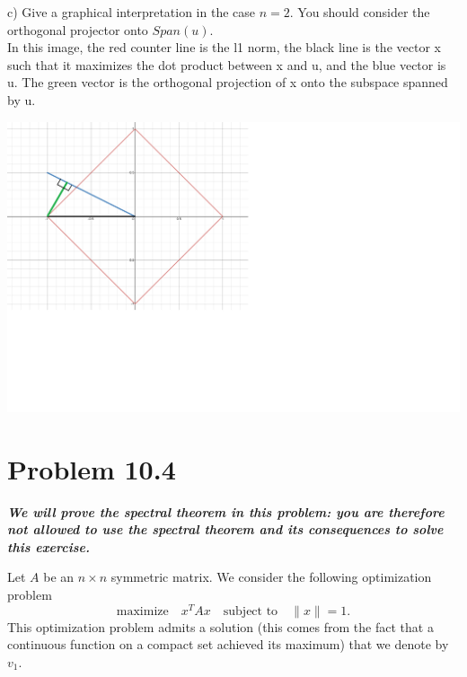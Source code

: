 \documentclass[12pt,twoside]{article}
\newcommand{\sT}{T}
\begin{document}
\newpage 

c) Give a graphical interpretation in the case $n=2$. You should consider the orthogonal projector onto $Span(u)$.\\

In this image, the red counter line is the l1 norm, the black line is the vector x such that it maximizes the dot product between x and u, and the blue vector is u. The green vector is the orthogonal projection of x onto the subspace spanned by u.

\includegraphics[scale=.5]{image2.png}



\newpage

\section{Problem 10.4}
	\emph{\textbf{We will prove the spectral theorem in this problem: you are therefore not allowed to use the spectral theorem and its consequences to solve this exercise.}}

	Let $A$ be an $n \times n$ symmetric matrix. We consider the following optimization problem
	\begin{equation}\label{eq:eig1}
		\text{maximize} \quad x^{\sT} A x \quad \text{subject to} \quad \|x\| = 1.
	\end{equation}
	This optimization problem admits a solution (this comes from the fact that a continuous function on a compact set achieved its maximum) that we denote by $v_1$.\\
\end{document}
